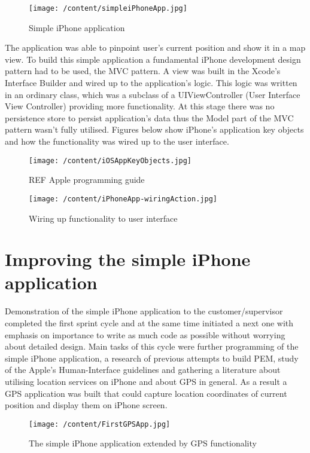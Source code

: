 \documentclass[12pt, a4paper]{report}   %
\begin{document}
\begin{enumerate}
\begin{figure}[H]
  \centering
	\texttt{[image: /content/simpleiPhoneApp.jpg]}
	  \caption{Simple iPhone application}
\end{figure}


The application was able to pinpoint user's current position and show it in a map view. To build this simple application a fundamental iPhone development design pattern had to be used, the MVC pattern. A view was built in the Xcode's Interface Builder and wired up to the application's logic. This logic was written in an ordinary class, which was a subclass of a UIViewController (User Interface View Controller) providing more functionality. At this stage there was no persistence store to persist application's data thus the Model part of the MVC pattern wasn't fully utilised. Figures below show iPhone's application key objects and how the functionality was wired up to the user interface.


\begin{figure}[H]
  \centering
	\texttt{[image: /content/iOSAppKeyObjects.jpg]}
	  \caption{REF Apple programming guide}
\end{figure}

\begin{figure}[H]
  \centering
	\texttt{[image: /content/iPhoneApp-wiringAction.jpg]}
	  \caption{Wiring up functionality to user interface}
\end{figure}


\clearpage
\section{Improving the simple iPhone application}
Demonstration of the simple iPhone application to the customer/supervisor completed the first sprint cycle and at the same time initiated a next one with emphasis on importance to write as much code as possible without worrying about detailed design. Main tasks of this cycle were further programming of the simple iPhone application, a research of previous attempts to build PEM, study of the Apple's Human-Interface guidelines and gathering a literature about utilising location services on iPhone and about GPS in general. As a result a GPS application was built that could capture location coordinates of current position and display them on iPhone screen.


\begin{figure}[H]
  \centering
	\texttt{[image: /content/FirstGPSApp.jpg]}
	  \caption{The simple iPhone application extended by GPS functionality}
\end{figure}



\end{enumerate}
\end{document}
